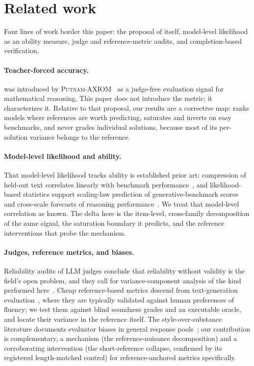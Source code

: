 \section{Related work}
\label{sec:related}

Four lines of work border this paper: the proposal of \tfa{} itself, model-level likelihood as an ability measure, judge and reference-metric audits, and completion-based verification.

\paragraph{Teacher-forced accuracy.}
\tfa{} was introduced by \textsc{Putnam-AXIOM}~\cite{gulati2025putnam} as a judge-free evaluation signal for mathematical reasoning.
This paper does not introduce the metric; it characterizes it.
Relative to that proposal, our results are a corrective map: \tfa{} ranks models where references are worth predicting, saturates and inverts on easy benchmarks, and never grades individual solutions, because most of its per-solution variance belongs to the reference.

\paragraph{Model-level likelihood and ability.}
That model-level likelihood tracks ability is established prior art: compression of held-out text correlates linearly with benchmark performance~\cite{huang2024compression}, and likelihood-based statistics support scaling-law prediction of generative-benchmark scores~\cite{schaeffer2025pretraining} and cross-scale forecasts of reasoning performance~\cite{koh2025rbridge}.
We treat that model-level correlation as known.
The delta here is the item-level, cross-family decomposition of the same signal, the saturation boundary it predicts, and the reference interventions that probe the mechanism.

\paragraph{Judges, reference metrics, and biases.}
Reliability audits of LLM judges conclude that reliability without validity is the field's open problem, and they call for variance-component analysis of the kind performed here~\cite{zheng2023judging,tan2024judgebench}.
Cheap reference-based metrics descend from text-generation evaluation~\cite{yuan2021bartscore}, where they are typically validated against human preferences of fluency; we test them against blind soundness grades and an executable oracle, and locate their variance in the reference itself.
The style-over-substance literature documents evaluator biases in general response pools~\cite{wu2023style,dubois2024length,singhal2023long}; our contribution is complementary, a mechanism (the reference-nuisance decomposition) and a corroborating intervention (the short-reference collapse, confirmed by its registered length-matched control) for reference-anchored metrics specifically.


